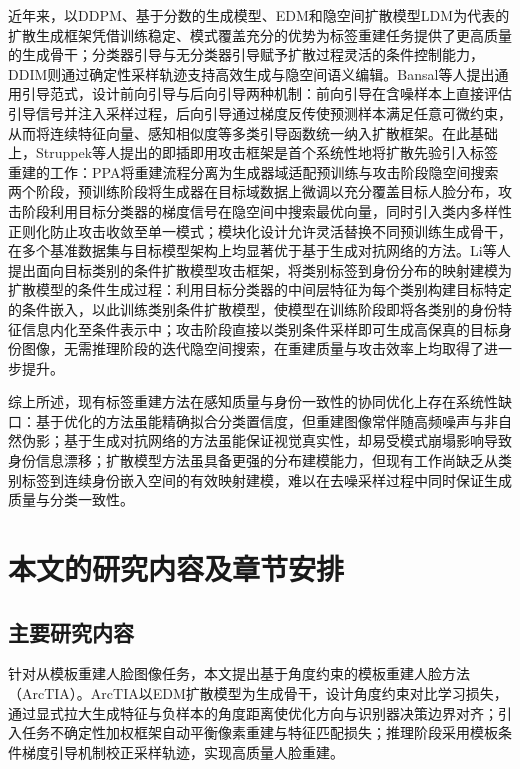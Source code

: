 近年来，以DDPM\cite{ho2020denoising}、基于分数的生成模型\cite{song2020score}、EDM\cite{karras2022elucidating}和隐空间扩散模型LDM\cite{rombach2022high}为代表的扩散生成框架凭借训练稳定、模式覆盖充分的优势为标签重建任务提供了更高质量的生成骨干；分类器引导\cite{dhariwal2021diffusion}与无分类器引导\cite{ho2022classifier}赋予扩散过程灵活的条件控制能力，DDIM\cite{song2020denoising}则通过确定性采样轨迹支持高效生成与隐空间语义编辑。Bansal等人\cite{bansal2023universal}提出通用引导范式，设计前向引导与后向引导两种机制：前向引导在含噪样本上直接评估引导信号并注入采样过程，后向引导通过梯度反传使预测样本满足任意可微约束，从而将连续特征向量、感知相似度等多类引导函数统一纳入扩散框架。在此基础上，Struppek等人\cite{struppek2022plug}提出的即插即用攻击框架是首个系统性地将扩散先验引入标签重建的工作：PPA将重建流程分离为生成器域适配预训练与攻击阶段隐空间搜索两个阶段，预训练阶段将生成器在目标域数据上微调以充分覆盖目标人脸分布，攻击阶段利用目标分类器的梯度信号在隐空间中搜索最优向量，同时引入类内多样性正则化防止攻击收敛至单一模式；模块化设计允许灵活替换不同预训练生成骨干，在多个基准数据集与目标模型架构上均显著优于基于生成对抗网络的方法。Li等人\cite{li2024model}提出面向目标类别的条件扩散模型攻击框架，将类别标签到身份分布的映射建模为扩散模型的条件生成过程：利用目标分类器的中间层特征为每个类别构建目标特定的条件嵌入，以此训练类别条件扩散模型，使模型在训练阶段即将各类别的身份特征信息内化至条件表示中；攻击阶段直接以类别条件采样即可生成高保真的目标身份图像，无需推理阶段的迭代隐空间搜索，在重建质量与攻击效率上均取得了进一步提升。

综上所述，现有标签重建方法在感知质量与身份一致性的协同优化上存在系统性缺口：基于优化的方法虽能精确拟合分类置信度，但重建图像常伴随高频噪声与非自然伪影；基于生成对抗网络的方法虽能保证视觉真实性，却易受模式崩塌影响导致身份信息漂移；扩散模型方法虽具备更强的分布建模能力，但现有工作尚缺乏从类别标签到连续身份嵌入空间的有效映射建模，难以在去噪采样过程中同时保证生成质量与分类一致性。

\section{本文的研究内容及章节安排}\label{sec:thesis_structure}

\subsection{主要研究内容}

针对从模板重建人脸图像任务，本文提出基于角度约束的模板重建人脸方法（ArcTIA）。ArcTIA以EDM扩散模型为生成骨干，设计角度约束对比学习损失，通过显式拉大生成特征与负样本的角度距离使优化方向与识别器决策边界对齐；引入任务不确定性加权框架自动平衡像素重建与特征匹配损失；推理阶段采用模板条件梯度引导机制校正采样轨迹，实现高质量人脸重建。

